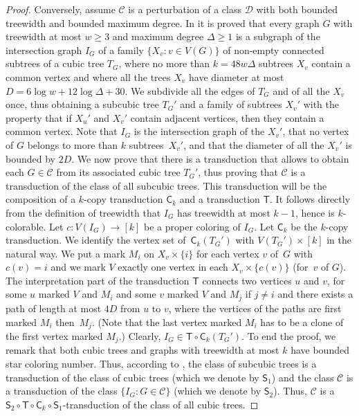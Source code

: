 \documentclass{lmcs}
\newcommand{\Cc}{\mathscr{C}}
\newcommand{\Dd}{\mathscr{D}}
\theoremstyle{definition}
\begin{document}
\begin{proof}
	Conversely, assume $\Cc$ is  a perturbation of a class $\Dd$ with both bounded treewidth and bounded maximum degree. 
	In \cite{DO95} it is proved that every graph $G$ with treewidth at most $w\geq 3$ and maximum degree $\Delta\geq 1$ is a subgraph of the intersection graph $I_G$ of a family $\{X_v\colon v\in V(G)\}$ of non-empty connected subtrees of a cubic tree $T_G$, where no more than   $k=48w\Delta$ subtrees $X_v$ contain a common vertex  and where all the trees $X_v$ have diameter at most $D=6\log w+12\log\Delta+30$.
	We subdivide all the edges of $T_G$ and of all the $X_v$ once, thus obtaining a subcubic tree $T_G'$ and a family of subtrees $X_v'$ with the property that if $X_u'$ and $X_v'$ contain adjacent vertices, then they contain a common vertex. Note that $I_G$ is the intersection graph of the $X_v'$, that no vertex of $G$ belongs to more than $k$ subtrees~$X_v'$, and that the diameter of all the $X_v'$ is bounded by $2D$.
	We now prove that there is a transduction that allows to obtain each $G\in\Cc$ from its associated cubic tree $T_G'$, thus proving that $\Cc$ is a transduction of the class of all subcubic trees. This transduction will be the composition of a $k$-copy transduction $\mathsf C_k$ and a transduction $\mathsf T$.
	It follows directly from the definition of treewidth that $I_G$ has treewidth at most $k-1$, hence is $k$-colorable. Let $c: V(I_G)\rightarrow [k]$ be a proper coloring of $I_G$. 
	Let $\mathsf C_k$ be the $k$-copy transduction.
	We identify the vertex set of~$\mathsf C_k(T_G')$ with $V(T_G')\times [k]$ in the natural way. We put a mark $M_i$ on $X_v\times\{i\}$ for each vertex $v$ of~$G$ with $c(v)=i$ and we mark $V$ exactly one vertex in each $X_v\times\{c(v)\}$  (for~$v$ of $G$).
   The interpretation part of the transduction $\mathsf T$ connects two vertices $u$ and $v$, for some $u$  marked $V$ and $M_i$ and some $v$ marked $V$ and $M_j$ if $j\neq i$ and there  exists 
   a path of length at most $4D$ from $u$ to $v$, where the vertices of the paths are first marked $M_i$ then~$M_j$. (Note that the last vertex marked $M_i$ has to be a clone of the first vertex marked $M_j$.)  Clearly, $I_G\in\mathsf T\circ\mathsf C_k(T_G')$.
	To end the proof, we remark that both cubic trees and graphs with treewidth at most $k$ have bounded star coloring number. Thus, according to , the class of subcubic trees is a transduction of the class of cubic trees (which we denote by $\mathsf S_1$) and the class $\Cc$ is a transduction of the class $\{I_G\colon G\in\Cc\}$ (which we denote by $\mathsf S_2$).
	Thus, $\Cc$ is a $\mathsf S_2\circ\mathsf T\circ\mathsf C_k\circ\mathsf S_1$-transduction of the class of all cubic trees.
\end{proof}
\end{document}
